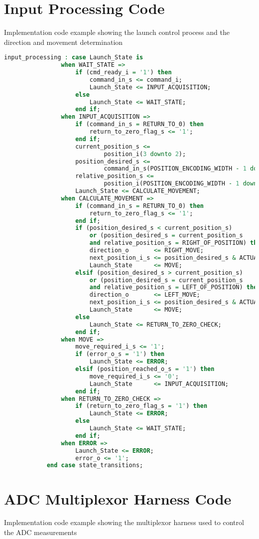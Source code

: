 \section{Input Processing Code}
\label{input-processing-code}
Implementation code example showing the launch control process and the direction and movement determination

\begin{lstlisting}[language=VHDL]
input_processing : case Launch_State is
				when WAIT_STATE =>
					if (cmd_ready_i = '1') then
						command_in_s <= command_i;
						Launch_State <= INPUT_ACQUISITION;
					else
						Launch_State <= WAIT_STATE;
					end if;
				when INPUT_ACQUISITION => 
					if (command_in_s = RETURN_TO_0) then
						return_to_zero_flag_s <= '1';
					end if;
					current_position_s <= 
					        position_i(3 downto 2);
					position_desired_s <= 
					        command_in_s(POSITION_ENCODING_WIDTH - 1 downto 0);
					relative_position_s <= 
					        position_i(POSITION_ENCODING_WIDTH - 1 downto 0);
					Launch_State <= CALCULATE_MOVEMENT;
				when CALCULATE_MOVEMENT =>
					if (command_in_s = RETURN_TO_0) then
						return_to_zero_flag_s <= '1';
					end if;
					if (position_desired_s < current_position_s) 
					    or (position_desired_s = current_position_s 
					    and relative_position_s = RIGHT_OF_POSITION) then
						direction_o       <= RIGHT_MOVE;
						next_position_i_s <= position_desired_s & ACTUAL_POSITION;
						Launch_State      <= MOVE;
					elsif (position_desired_s > current_position_s)
					    or (position_desired_s = current_position_s 
					    and relative_position_s = LEFT_OF_POSITION) then
						direction_o       <= LEFT_MOVE;
						next_position_i_s <= position_desired_s & ACTUAL_POSITION;
						Launch_State      <= MOVE;
					else
						Launch_State <= RETURN_TO_ZERO_CHECK;
					end if;
				when MOVE =>
					move_required_i_s <= '1';
					if (error_o_s = '1') then
						Launch_State <= ERROR;
					elsif (position_reached_o_s = '1') then
						move_required_i_s <= '0';
						Launch_State      <= INPUT_ACQUISITION;
					end if;
				when RETURN_TO_ZERO_CHECK =>
					if (return_to_zero_flag_s = '1') then
						Launch_State <= ERROR;
					else
						Launch_State <= WAIT_STATE;
					end if;
				when ERROR =>           
					Launch_State <= ERROR;
					error_o <= '1';
			end case state_transitions;
\end{lstlisting}



\section{ADC Multiplexor Harness Code}
\label{adc-multiplexing-code}
Implementation code example showing the multiplexor harness used to control the ADC measurements

